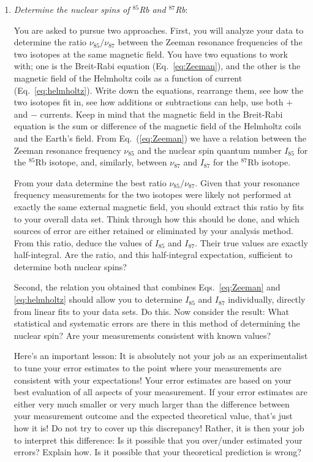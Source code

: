 \documentclass{../lab}
\begin{document}
\begin{enumerate}
    \item \emph{Determine the nuclear spins of $^{85}$Rb and $^{87}$Rb}:
    
    You are asked to pursue two approaches.  First, you will analyze your data to determine the ratio $\nu_{85}/\nu_{87}$ between the Zeeman resonance frequencies of the two isotopes at the same magnetic field.  You have two equations to work with; one is the Breit-Rabi equation (Eq.\ \ref{eq:Zeeman}), and the other is the magnetic field of the Helmholtz coils as a function of current (Eq.\ \ref{eq:helmholtz}). Write down the equations, rearrange them, see how the two isotopes fit in, see how additions or subtractions can help, use both $+$ and $-$ currents. Keep in mind that the  magnetic field in the Breit-Rabi equation is the sum or difference of the magnetic field of the Helmholtz coils and the Earth's field. From Eq.\ (\ref{eq:Zeeman}) we have a relation between the Zeeman resonance frequency $\nu_{85}$ and the nuclear spin quantum number $I_{85}$ for the $^{85}$Rb isotope, and, similarly, between $\nu_{87}$ and $I_{87}$ for the $^{87}$Rb isotope.
    
     From your data determine the best ratio $\nu_{85} / \nu_{87}$.  Given that your resonance frequency measurements for the two isotopes were likely not performed at exactly the same external magnetic field, you should extract this ratio by fits to your overall data set.  Think through how this should be done, and which sources of error are either retained or eliminated by your analysis method.  From this ratio, deduce the values of $I_{85}$ and $I_{87}$. Their true values are exactly half-integral. Are the ratio, and this half-integral expectation, sufficient to determine both nuclear spins?
    
    Second, the relation you obtained that combines Eqs.\ \ref{eq:Zeeman} and \ref{eq:helmholtz} should allow you to determine $I_{85}$ and $I_{87}$ individually, directly from linear fits to your data sets.  Do this.  Now consider the result: What statistical and systematic errors are there in this method of determining the nuclear spin?  Are your measurements consistent with known values?
    
    Here's an important lesson:  It is absolutely not your job as an experimentalist to tune your error estimates to the point where your measurements are consistent with your expectations!  Your error estimates are based on your best evaluation of all aspects of your measurement. If your error estimates are either very much smaller or very much larger than the difference between your measurement outcome and the expected theoretical value, that's just how it is!  Do not try to cover up this discrepancy!  Rather, it is then your job to interpret this difference: Is it possible that you over/under estimated your errors?  Explain how.  Is it possible that your theoretical prediction is wrong?


\end{enumerate}
\end{document}

